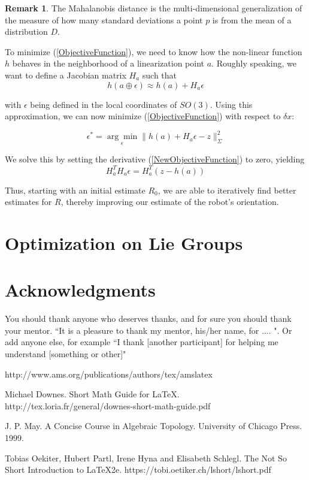 \documentclass[reqno]{amsart}
\theoremstyle{definition}
\newtheorem{rem}{Remark}[section]
\numberwithin{equation}{section}
\begin{document}
\begin{rem}
    The Mahalanobis distance is the multi-dimensional generalization of the measure of how many standard deviations a point $p$ is from the mean of a distribution $D$.
\end{rem}

To minimize (\ref{ObjectiveFunction}), we need to know how the non-linear function $h$ behaves in the neighborhood of a linearization point $a$. Roughly speaking, we want to define a Jacobian matrix $H_a$ such that
\begin{equation}
    h(a \oplus \epsilon) \approx h(a) + H_a\epsilon
\end{equation}

with $\epsilon$ being defined in the local coordinates of $SO(3)$. Using this approximation, we can now minimize (\ref{ObjectiveFunction}) with respect to $\delta{x}$:

\begin{equation}\label{NewObjectiveFunction}
    \epsilon^* = \underset{\epsilon}{\arg\min}\|h(a) + H_a\epsilon - z\|_\Sigma^2
\end{equation}

We solve this by setting the derivative (\ref{NewObjectiveFunction}) to zero, yielding
\begin{equation*}
    H_a^TH_a\epsilon = H_a^T(z - h(a))
\end{equation*}

Thus, starting with an initial estimate $R_0$, we are able to iteratively find better estimates for $R$, thereby improving our estimate of the robot's orientation. 

\section{Optimization on Lie Groups}

\section*{Acknowledgments}  You should thank anyone who deserves thanks, and for sure you should
thank your mentor.   ``It is a pleasure to thank my mentor, 
his/her name, for ....  ".   Or add anyone else, for example ``I thank [another participant] for helping 
me understand [something or other]"

\begin{thebibliography}{9}

 http://www.ams.org/publications/authors/tex/amslatex

Michael Downes.
Short Math Guide for \LaTeX.
http://tex.loria.fr/general/downes-short-math-guide.pdf

J. P. May.
A Concise Course in Algebraic Topology.
University of Chicago Press. 1999. 

Tobias Oekiter, Hubert Partl, Irene Hyna and Elisabeth Schlegl.
The Not So Short Introduction to \LaTeX 2e.
https://tobi.oetiker.ch/lshort/lshort.pdf

\end{thebibliography}
\end{document}
